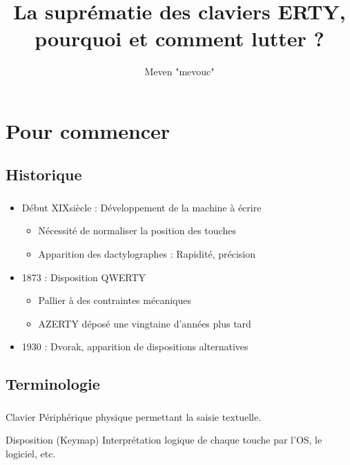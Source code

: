 \documentclass[c,12pt]{beamer}
\title{La suprématie des claviers ERTY, pourquoi et comment lutter ?}
\author{Meven "mevouc" \bsc{Courouble}}
\date{\oldstylenums{December 2015}}
\begin{document}
\frame{\titlepage}

\section{Pour commencer}
\subsection{Historique}

\begin{frame}
	\frametitle{\subsecname}
	\begin{itemize}
		\item<1-> Début XIX\ieme siècle : Développement de la machine à écrire
			\begin{itemize}
				\item<2-> Nécessité de normaliser la position des touches
				\item<3-> Apparition des dactylographes : Rapidité, précision
			\end{itemize}
		\item<4-> 1873 : Disposition QWERTY
			\begin{itemize}
				\item<5-> Pallier à des contraintes mécaniques 
				\item<6-> AZERTY déposé une vingtaine d'années plus tard
			\end{itemize}
		\item<7-> 1930 : Dvorak, apparition de dispositions alternatives
	\end{itemize}
\end{frame}

\subsection{Terminologie}

\begin{frame}
	\frametitle{\subsecname}
	\begin{block}{Clavier}
		Périphérique physique permettant la saisie textuelle.
	\end{block}
	\begin{block}{Disposition (Keymap)}
		Interprétation logique de chaque touche par l'OS, le logiciel, etc.
	\end{block}
\end{frame}
\end{document}
